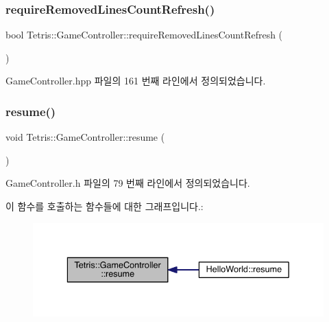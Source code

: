 \subsubsection{\texorpdfstring{require\+Removed\+Lines\+Count\+Refresh()}{requireRemovedLinesCountRefresh()}}
{\footnotesize\ttfamily bool Tetris\+::\+Game\+Controller\+::require\+Removed\+Lines\+Count\+Refresh (\begin{DoxyParamCaption}{ }\end{DoxyParamCaption})\hspace{0.3cm}{\ttfamily [inline]}}



Game\+Controller.\+hpp 파일의 161 번째 라인에서 정의되었습니다.

\mbox{\label{class_tetris_1_1_game_controller_ab9ff093ea91e3d248a8a287289e758b0}} 
\subsubsection{\texorpdfstring{resume()}{resume()}\hspace{0.1cm}{\footnotesize\ttfamily [1/2]}}
{\footnotesize\ttfamily void Tetris\+::\+Game\+Controller\+::resume (\begin{DoxyParamCaption}{ }\end{DoxyParamCaption})\hspace{0.3cm}{\ttfamily [inline]}}



Game\+Controller.\+h 파일의 79 번째 라인에서 정의되었습니다.

이 함수를 호출하는 함수들에 대한 그래프입니다.\+:
\nopagebreak
\begin{figure}[H]
\begin{center}
\leavevmode
\includegraphics[width=336pt]{class_tetris_1_1_game_controller_ab9ff093ea91e3d248a8a287289e758b0_icgraph}
\end{center}
\end{figure}
\mbox{\label{class_tetris_1_1_game_controller_ab9ff093ea91e3d248a8a287289e758b0}} 

